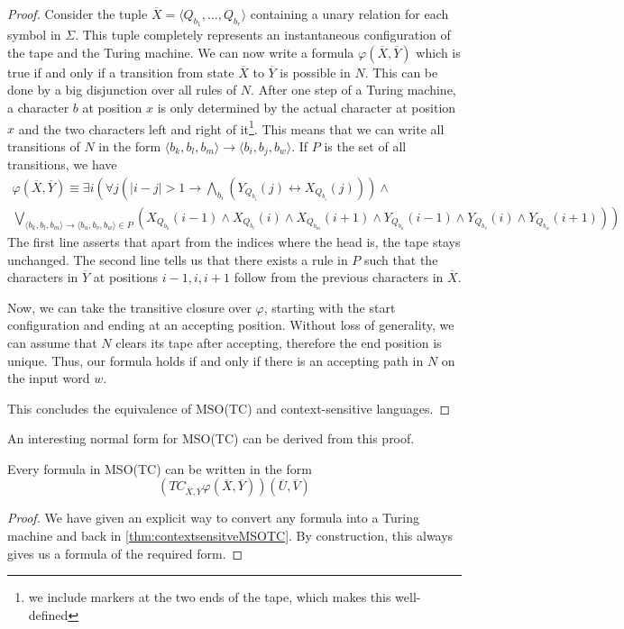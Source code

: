 \begin{proof}
    Consider the tuple $\overline{X} = \langle Q_{b_1}, \dots, Q_{b_r} \rangle$ containing a unary relation for each symbol in $\Sigma$.
    This tuple completely represents an instantaneous configuration of the tape and the Turing machine.
    We can now write a formula $\varphi(\overline{X}, \overline{Y})$ which is true if and only if a transition from state $\overline{X}$ to $\overline{Y}$ is possible in $N$.
    This can be done by a big disjunction over all rules of $N$.
    After one step of a Turing machine, a character $b$ at position $x$ is only determined by the actual character at position $x$ and the two characters left and right of it\footnote{we include markers at the two ends of the tape, which makes this well-defined}.
    This means that we can write all transitions of $N$ in the form $\langle b_{k},b_{l},b_{m}\rangle \to \langle b_{i}, b_{j}, b_{w} \rangle$.
    If $P$ is the set of all transitions, we have
    \begin{multline*}
        \varphi(\overline{X}, \overline{Y}) \equiv \exists i \left(\forall j \left(|i - j| > 1 \to \bigwedge_{b_i}\left(Y_{Q_{b_i}}(j) \leftrightarrow X_{Q_{b_i}}(j)\right)\right) \land \right. \\
        \left. \bigvee_{\langle b_{k},b_{l},b_{m}\rangle \to \langle b_{u}, b_{v}, b_{w} \rangle \in P} \left(X_{Q_{b_{k}}}(i - 1) \land X_{Q_{b_{l}}}(i) \land X_{Q_{b_{m}}}(i + 1) \land Y_{Q_{b_{u}}}(i - 1) \land Y_{Q_{b_{v}}}(i) \land Y_{Q_{b_{w}}}(i + 1) \right)\right)
    \end{multline*}
    The first line asserts that apart from the indices where the head is, the tape stays unchanged.
    The second line tells us that there exists a rule in $P$ such that the characters in $\overline{Y}$ at positions $i - 1, i, i + 1$ follow from the previous characters in $\overline{X}$.

    Now, we can take the transitive closure over $\varphi$, starting with the start configuration and ending at an accepting position.
    Without loss of generality, we can assume that $N$ clears its tape after accepting, therefore the end position is unique.
    Thus, our formula holds if and only if there is an accepting path in $N$ on the input word $w$.

    This concludes the equivalence of MSO(TC) and context-sensitive languages.
\end{proof}

An interesting normal form for MSO(TC) can be derived from this proof.
\begin{corollary}
    Every formula in MSO(TC) can be written in the form
    \[
        \left( TC_{\overline{X}, \overline{Y}} \varphi(\overline{X}, \overline{Y}) \right)\left( \overline{U}, \overline{V} \right)
    \]
\end{corollary}

\begin{proof}
    We have given an explicit way to convert any formula into a Turing machine and back in \cref{thm:contextsensitveMSOTC}.
    By construction, this always gives us a formula of the required form.
\end{proof}

